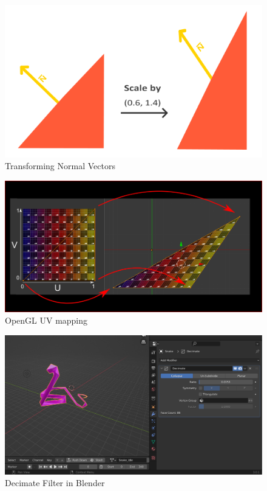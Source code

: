 \documentclass{article}
\begin{document}
    \begin{figure}
        \centering
        \includegraphics[width=\textwidth]{images/transforming_normals.png}
        \caption{Transforming Normal Vectors \cite{learnopengl-lighting}} \label{fig:normals}
    \end{figure}
    \begin{figure}
        \centering
        \includegraphics[width=\textwidth]{images/opengluv.png}
        \caption{OpenGL UV mapping \cite{opengl-tutorial-textured-cube}} \label{fig:uvmapping}
    \end{figure}
    \begin{figure}
        \centering
        \includegraphics[width=\textwidth]{images/decimate.png}
        \caption{Decimate Filter in Blender} \label{fig:decimate}
    \end{figure}
\end{document}
